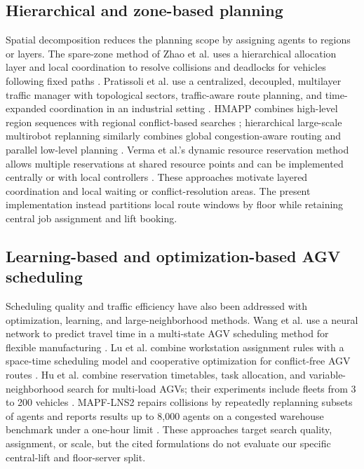 \subsection{Hierarchical and zone-based planning}

Spatial decomposition reduces the planning scope by assigning agents to
regions or layers. The spare-zone method of Zhao et al. uses a hierarchical
allocation layer and local coordination to resolve collisions and deadlocks
for vehicles following fixed paths \cite{zhao2021}. Pratissoli et al. use a
centralized, decoupled, multilayer traffic manager with topological sectors,
traffic-aware route planning, and time-expanded coordination in an industrial
setting \cite{pratissoli2024}. HMAPP combines high-level region sequences
with regional conflict-based searches \cite{hmapp2021}; hierarchical
large-scale multirobot replanning similarly combines global congestion-aware
routing and parallel low-level planning \cite{pan2024}. Verma et al.'s
dynamic resource reservation method allows multiple reservations at shared
resource points and can be implemented centrally or with local controllers
\cite{verma2024}. These approaches motivate layered coordination and local
waiting or conflict-resolution areas. The present implementation instead
partitions local route windows by floor while retaining central job
assignment and lift booking.

\subsection{Learning-based and optimization-based AGV scheduling}

Scheduling quality and traffic efficiency have also been addressed with
optimization, learning, and large-neighborhood methods. Wang et al. use a
neural network to predict travel time in a multi-state AGV scheduling method
for flexible manufacturing \cite{wang2022}. Lu et al. combine workstation
assignment rules with a space-time scheduling model and cooperative
optimization for conflict-free AGV routes \cite{lu2023}. Hu et al. combine
reservation timetables, task allocation, and variable-neighborhood search
for multi-load AGVs; their experiments include fleets from 3 to 200 vehicles
\cite{hu2022}. MAPF-LNS2 repairs collisions by repeatedly replanning subsets
of agents and reports results up to 8,000 agents on a congested warehouse
benchmark under a one-hour limit \cite{mapflns2022}. These approaches target
search quality, assignment, or scale, but the cited formulations do not
evaluate our specific central-lift and floor-server split.

